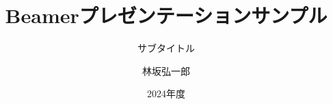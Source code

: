 \documentclass[12pt,dvipdfmx,aspectratio=169]{beamer}
\title{Beamerプレゼンテーションサンプル}
\subtitle{サブタイトル}
\author{林坂弘一郎}
\date{2024年度}
\institute[神戸学院大学]{神戸学院大学 経営学部}
\begin{document}
\frame{\titlepage}
\section[Outline]{}
\frame{\tableofcontents}

\end{document}
